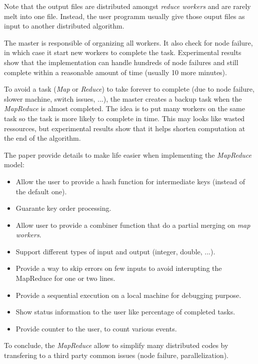 \documentclass{article}
\begin{document}
Note that the output files are distributed amongst \textit{reduce workers} and are rarely melt into one file.
Instead, the user programm usually give those ouput files as input to another distributed algorithm.

The master is responsible of organizing all workers.
It also check for node failure, in which case it start new workers to complete the task.
Experimental results show that the implementation can handle hundreds of node failures and still complete within a reasonable amount of time (usually 10 more minutes).

To avoid a task (\textit{Map} or \textit{Reduce}) to take forever to complete (due to node failure, slower machine, switch issues, ...), the master creates a backup task when the \textit{MapReduce} is almost completed.
The idea is to put many workers on the same task so the task is more likely to complete in time.
This may looks like wasted ressources, but experimental results show that it helps shorten computation at the end of the algorithm.

The paper provide details to make life easier when implementing the \textit{MapReduce} model:
\begin{itemize}
	\item Allow the user to provide a hash function for intermediate keys (instead of the default one).
	\item Guarante key order processing.
	\item Allow user to provide a combiner function that do a partial merging on \textit{map workers}.
	\item Support different types of input and output (integer, double, ...).
	\item Provide a way to skip errors on few inputs to avoid interupting the MapReduce for one or two lines.
	\item Provide a sequential execution on a local machine for debugging purpose.
	\item Show status information to the user like percentage of completed tasks.
	\item Provide counter to the user, to count various events.
\end{itemize}

To conclude, the \textit{MapReduce} allow to simplify many distributed codes by transfering to a third party common issues (node failure, parallelization).
\end{document}
